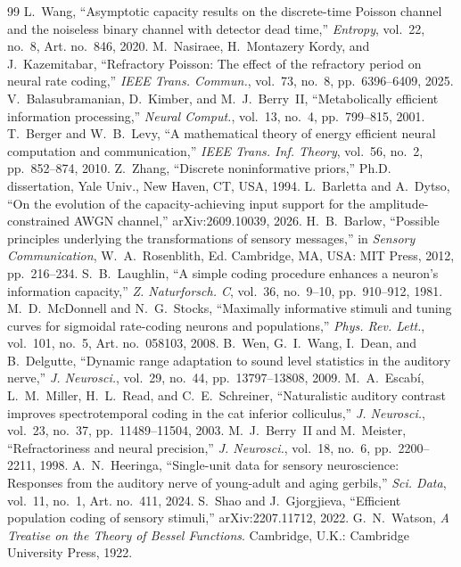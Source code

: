 \documentclass[journal]{IEEEtran}
\begin{document}
\begin{thebibliography}{99}
 L.~Wang, ``Asymptotic capacity results on the discrete-time Poisson channel and the noiseless binary channel with detector dead time,'' \emph{Entropy}, vol.~22, no.~8, Art. no.~846, 2020.%
 M.~Nasiraee, H.~Montazery Kordy, and J.~Kazemitabar, ``Refractory Poisson: The effect of the refractory period on neural rate coding,'' \emph{IEEE Trans. Commun.}, vol.~73, no.~8, pp.~6396--6409, 2025.%
 V.~Balasubramanian, D.~Kimber, and M.~J.~Berry~II, ``Metabolically efficient information processing,'' \emph{Neural Comput.}, vol.~13, no.~4, pp.~799--815, 2001.
 T.~Berger and W.~B.~Levy, ``A mathematical theory of energy efficient neural computation and communication,'' \emph{IEEE Trans. Inf. Theory}, vol.~56, no.~2, pp.~852--874, 2010.
 Z.~Zhang, ``Discrete noninformative priors,'' Ph.D. dissertation, Yale Univ., New Haven, CT, USA, 1994.%
 L.~Barletta and A.~Dytso, ``On the evolution of the capacity-achieving input support for the amplitude-constrained AWGN channel,'' arXiv:2609.10039, 2026.
 H.~B.~Barlow, ``Possible principles underlying the transformations of sensory messages,'' in \emph{Sensory Communication}, W.~A.~Rosenblith, Ed. Cambridge, MA, USA: MIT Press, 2012, pp.~216--234.%
 S.~B.~Laughlin, ``A simple coding procedure enhances a neuron's information capacity,'' \emph{Z. Naturforsch. C}, vol.~36, no.~9--10, pp.~910--912, 1981.%
 M.~D.~McDonnell and N.~G.~Stocks, ``Maximally informative stimuli and tuning curves for sigmoidal rate-coding neurons and populations,'' \emph{Phys. Rev. Lett.}, vol.~101, no.~5, Art. no.~058103, 2008.
 B.~Wen, G.~I.~Wang, I.~Dean, and B.~Delgutte, ``Dynamic range adaptation to sound level statistics in the auditory nerve,'' \emph{J. Neurosci.}, vol.~29, no.~44, pp.~13797--13808, 2009.
 M.~A.~Escabí, L.~M.~Miller, H.~L.~Read, and C.~E.~Schreiner, ``Naturalistic auditory contrast improves spectrotemporal coding in the cat inferior colliculus,'' \emph{J. Neurosci.}, vol.~23, no.~37, pp.~11489--11504, 2003.
 M.~J.~Berry~II and M.~Meister, ``Refractoriness and neural precision,'' \emph{J. Neurosci.}, vol.~18, no.~6, pp.~2200--2211, 1998.
 A.~N.~Heeringa, ``Single-unit data for sensory neuroscience: Responses from the auditory nerve of young-adult and aging gerbils,'' \emph{Sci. Data}, vol.~11, no.~1, Art. no.~411, 2024.
 S.~Shao and J.~Gjorgjieva, ``Efficient population coding of sensory stimuli,'' arXiv:2207.11712, 2022.
 G.~N.~Watson, \emph{A Treatise on the Theory of Bessel Functions}. Cambridge, U.K.: Cambridge University Press, 1922.
\end{thebibliography}
\end{document}
